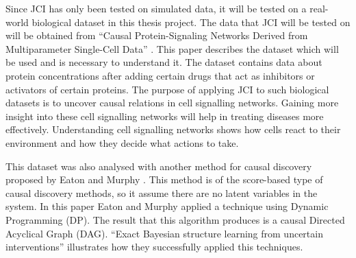 \documentclass[11pt]{article}
\begin{document}

Since JCI has only been tested on simulated data, it will be tested on a real-world biological dataset in this thesis project.  The data that JCI will be tested on will be obtained from ``Causal Protein-Signaling Networks Derived from Multiparameter Single-Cell Data'' \cite{sachs2005causal}. This paper describes the dataset which will be used and is necessary to understand it.  The dataset contains data about protein concentrations after adding certain drugs that act as inhibitors or activators of certain proteins. The purpose of applying JCI to such biological datasets is to uncover causal relations in cell signalling networks. Gaining more insight into these cell signalling networks will help in treating diseases more effectively. Understanding cell signalling networks shows how cells react to their environment and how they decide what actions to take.

This dataset was also analysed with another method for causal discovery proposed by Eaton and Murphy \cite{eaton2007exact}. This method is of the score-based type of causal discovery methods, so it assume there are no latent variables in the system. In this paper Eaton and Murphy applied a technique using Dynamic Programming (DP). The result that this algorithm produces is a causal Directed Acyclical Graph (DAG). ``Exact Bayesian structure learning from uncertain interventions'' illustrates how they successfully applied this techniques. 
    




 
\end{document}
